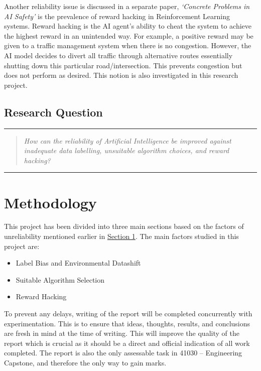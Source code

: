 \documentclass[a4paper,12pt]{report}
\begin{document}
Another reliability issue is discussed in a separate paper, \textit{‘Concrete Problems in AI Safety’} \cite{Amodei} is the prevalence of reward hacking in Reinforcement Learning systems. 
Reward hacking is the AI agent’s ability to cheat the system to achieve the highest reward in an unintended way. 
For example, a positive reward may be given to a traffic management system when there is no congestion. However, the AI model decides to divert all traffic through alternative routes essentially shutting down this particular road/intersection. 
This prevents congestion but does not perform as desired. This notion is also investigated in this research project.

\section{Research Question}
\noindent\rule{\linewidth}{0.4pt}
\begin{quotation}
\textit{How can the reliability of Artificial Intelligence be improved against 
inadequate data labelling, unsuitable algorithm choices, and reward 
hacking?}
\end{quotation}
\noindent\rule{\linewidth}{0.4pt}

\chapter{Methodology}
This project has been divided into three main sections based on the factors of unreliability mentioned earlier in \hyperref[chap:chap1]{Section 1}. 
The main factors studied in this project are:
\begin{itemize}
    \item Label Bias and Environmental Datashift
    \item Suitable Algorithm Selection
    \item Reward Hacking
\end{itemize}

To prevent any delays, writing of the report will be completed 
concurrently with experimentation. This is to ensure that ideas, 
thoughts, results, and conclusions are fresh in mind at the time of 
writing. This will improve the quality of the report which is crucial 
as it should be a direct and official indication of all work completed. 
The report is also the only assessable task in 41030 – Engineering 
Capstone, and therefore the only way to gain marks.
\end{document}
